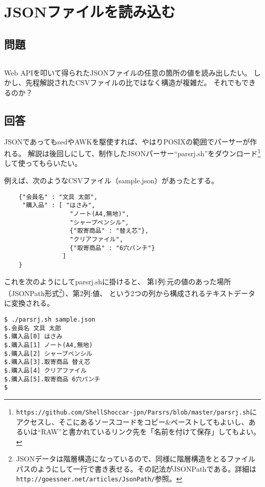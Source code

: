 \section{JSONファイルを読み込む}
\label{recipe:JSON_parser}

\subsection*{問題}
\noindent
$\!\!\!\!\!$
\begin{grshfboxit}{160.0mm}
	Web APIを叩いて得られたJSONファイルの任意の箇所の値を読み出したい。
	しかし、先程解説されたCSVファイルの比ではなく構造が複雑だ。
	それでもできるのか？
\end{grshfboxit}

\subsection*{回答}
JSONであってもsedやAWKを駆使すれば、やはりPOSIXの範囲でパーサーが作れる。
解説は後回しにして、制作したJSONパーサー``parsrj.sh''をダウンロード\footnote{\verb|https://github.com/ShellShoccar-jpn/Parsrs/blob/master/parsrj.sh|にアクセスし、そこにあるソースコードをコピー\&{}ペーストしてもよいし、あるいは``RAW''と書かれているリンク先を「名前を付けて保存」してもよい。}して使ってもらいたい。

例えば、次のようなCSVファイル（sample.json）があったとする。\\
\begin{frameboxit}{160.0mm}
\begin{verbatim}
	{"会員名" : "文具 太郎",
	 "購入品" : [ "はさみ",
	              "ノート(A4,無地)",
	              "シャープペンシル",
	              {"取寄商品" : "替え芯"},
	              "クリアファイル",
	              {"取寄商品" : "6穴パンチ"}
	            ]
	}
\end{verbatim}
\end{frameboxit}

これを次のようにしてparsrj.shに掛けると、
第1列:元の値のあった場所（JSONPath形式\footnote{JSONデータは階層構造になっているので、同様に階層構造をとるファイルパスのようにして一行で書き表せる。その記法がJSONPathである。詳細は\verb|http://goessner.net/articles/JsonPath/|参照。}）、第2列:値、
という2つの列から構成されるテキストデータに変換される。
\begin{screen}
	\verb|$ ./parsrj.sh sample.json| \return \\
	\verb|$.会員名 文具 太郎| \\
	\verb|$.購入品[0] はさみ| \\
	\verb|$.購入品[1] ノート(A4,無地)| \\
	\verb|$.購入品[2] シャープペンシル| \\
	\verb|$.購入品[3].取寄商品 替え芯| \\
	\verb|$.購入品[4] クリアファイル| \\
	\verb|$.購入品[5].取寄商品 6穴パンチ| \\
	\verb|$ |
\end{screen}

